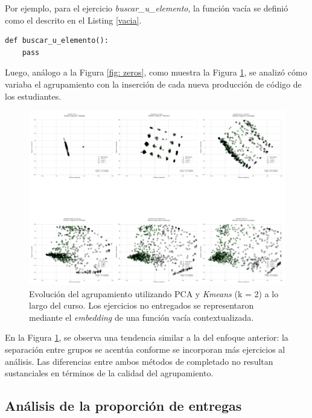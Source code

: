 \documentclass[11pt,a4paper,twoside,openany]{tesis}
\begin{document}
Por ejemplo, para el ejercicio \emph{buscar\_u\_elemento}, la función vacía se definió como el descrito en el Listing \ref{vacia}. 

\begin{lstlisting}[style=pythonstyle, label={vacia}, caption={Ejemplo de función vacía para un ejercicio del curso.}]
def buscar_u_elemento():
    pass
\end{lstlisting}

Luego, análogo a la Figura \ref{fig: zeros}, como muestra la Figura \ref{fig: fill func}, se analizó cómo variaba el agrupamiento con la inserción de cada nueva producción de código de los estudiantes.

\begin{figure}[H]
    \centering
    \includegraphics[width=\textwidth]{imagenes/zerostodos_los_graficos_en_una_sola_figura_6.png}
    \caption{Evolución del agrupamiento utilizando PCA y \emph{Kmeans} (k = 2) a lo largo del curso. Los ejercicios no entregados se representaron mediante el \emph{embedding} de una función vacía contextualizada.}
    \label{fig: fill func}
\end{figure}

En la Figura \ref{fig: fill func}, se observa una tendencia similar a la del enfoque anterior: la separación entre grupos se acentúa conforme se incorporan más ejercicios al análisis. Las diferencias entre ambos métodos de completado no resultan sustanciales en términos de la calidad del agrupamiento.

\subsection{Análisis de la proporción de entregas}
\end{document}
